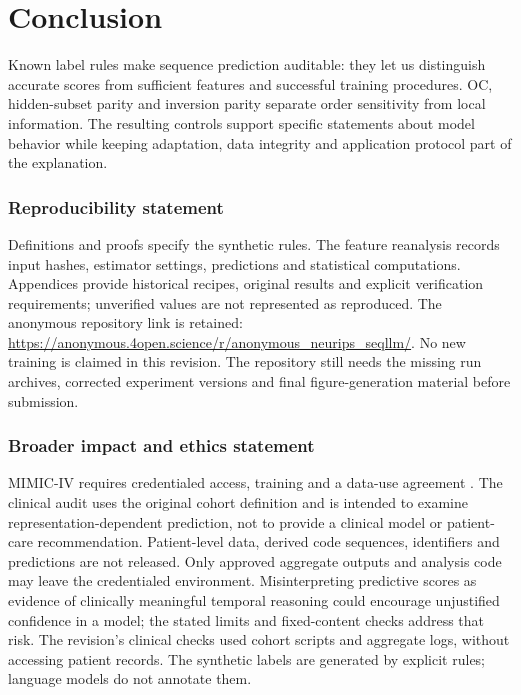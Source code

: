 \documentclass[10pt]{article}
\begin{document}
\section{Conclusion}
Known label rules make sequence prediction auditable: they let us distinguish accurate scores from sufficient features and successful training procedures. OC, hidden-subset parity and inversion parity separate order sensitivity from local information. The resulting controls support specific statements about model behavior while keeping adaptation, data integrity and application protocol part of the explanation.
\FloatBarrier
\label{LastMainPage}
\subsubsection*{Reproducibility statement}
Definitions and proofs specify the synthetic rules. The feature reanalysis records input hashes, estimator settings, predictions and statistical computations. Appendices provide historical recipes, original results and explicit verification requirements; unverified values are not represented as reproduced. The anonymous repository link is retained: \url{https://anonymous.4open.science/r/anonymous_neurips_seqllm/}. No new training is claimed in this revision. The repository still needs the missing run archives, corrected experiment versions and final figure-generation material before submission.

\subsubsection*{Broader impact and ethics statement}
MIMIC-IV requires credentialed access, training and a data-use agreement \citep{johnson2023}. The clinical audit uses the original cohort definition and is intended to examine representation-dependent prediction, not to provide a clinical model or patient-care recommendation. Patient-level data, derived code sequences, identifiers and predictions are not released. Only approved aggregate outputs and analysis code may leave the credentialed environment. Misinterpreting predictive scores as evidence of clinically meaningful temporal reasoning could encourage unjustified confidence in a model; the stated limits and fixed-content checks address that risk. The revision's clinical checks used cohort scripts and aggregate logs, without accessing patient records. The synthetic labels are generated by explicit rules; language models do not annotate them.
\end{document}
